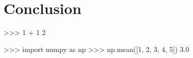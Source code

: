 \chapter{Conclusion}\label{chapter:conclusion}

\begin{usagepy}
>>> 1 + 1
2

>>> import numpy as np
>>> np.mean([1, 2, 3, 4, 5])
3.0

\end{usagepy}